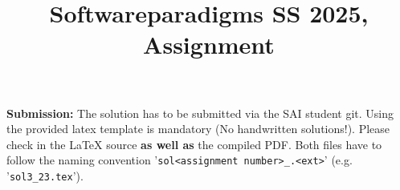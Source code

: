 \documentclass[10pt, a4paper]{article}
\author{}
\date{} %
\title{Softwareparadigms SS 2025, Assignment \AssignmentNumber}
\begin{document}
\newcommand{\seccounter}{\addtocounter{section}{1} \thesection}
\newcommand{\beispiel}[2]{\subsection*{Task \seccounter: #1 \qquad \textnormal{($#2$ P.)}}}
\newcommand{\bonusbsp}[2]{\subsection*{BONUS Task #1 \qquad \textnormal{($#2$ P.)}}}
\maketitle
\thispagestyle{fancy}

\newcommand{\abc}{\item[\alph{ale})]\stepcounter{ale}}
\newenvironment{liste}{\begin{itemize}}{\end{itemize}}
\newcommand{\aliste}{\begin{liste} \setcounter{ale}{1}}
\newcommand{\zliste}{\end{liste}}
\newenvironment{abcliste}{\aliste}{\zliste}
\newcommand{\wrd}[1]{\underline{\texttt{#1}}}
\newcommand{\al}[2]{I_{AL}(#1, \: #2)}
\newcommand{\alp}[2]{I_{ALP}(#1, \: #2)}
\newcommand{\term}[2]{I_{T}(\omega^{#1}, \: #2)}
\newcommand{\termP}[3]{I_{T}(\omega^{#1}, \sigma^{#2}, \: #3)}
\newcommand{\predicate}[2]{I_{PL}(\omega^{#1}, \: #2)}
\newcommand{\predicateP}[3]{I_{PL}(\omega^{#1},\sigma^{#2}, \: #3)}
\newcommand{\block}[2]{\wrd{begin} \: #1 - \: #2 \: \wrd{end}}
\newcommand{\nenv}[2]{{\color{orange}Env \: \omega^{#1} : \omega^{#1} #2}}
\newcommand{\nstate}[2]{{\color{brown}State \: \sigma^{#1} : \sigma^{#1} #2}}
\newcommand{\nr}[1]{{\color{blue}NR: \: #1}}
\newcommand{\copyEnv}[2]{\sim_{\wrd{#2}}\omega^{#1}}
\newcommand{\copyState}[3]{\sim_{\omega^{#2}(\wrd{#3})}\sigma^{#1}}
\newcommand{\interp}[2]{I_\mathcal{T}(\omega^{#1}, \wrd{#2})}

\newcommand{\ts}[1]{\textsubscript{#1}}
\newcommand{\changed}[1]{{\color{cyan}#1}}
\lstset{basicstyle=\ttfamily}

\textbf{Submission:}
The solution has to be submitted via the SAI student git. Using the
provided latex template is mandatory (No handwritten solutions!). Please check in the \LaTeX{} source
\textbf{as well as} the compiled PDF. Both files have to follow the naming
convention '\texttt{sol<assignment number>\_<group number>.<ext>}' (e.g. '\texttt{sol3\_23.tex}').
\end{document}

